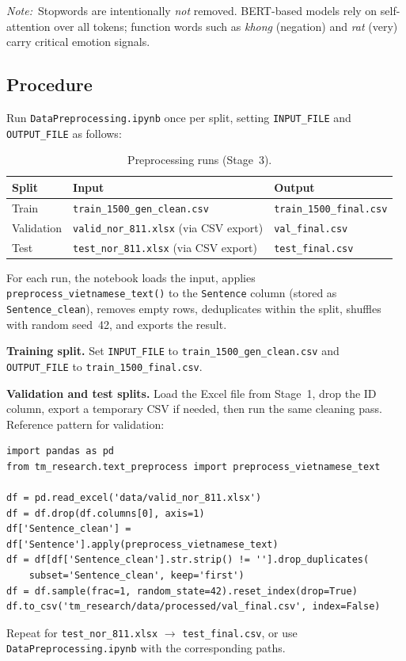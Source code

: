 \documentclass[11pt,a4paper]{article}
\newcommand{\repo}[1]{\texttt{#1}}
\newcommand{\note}[1]{\textit{Note:}~#1}
\begin{document}
\note{Stopwords are intentionally \emph{not} removed. BERT-based models rely on self-attention over all tokens; function words such as \emph{khong} (negation) and \emph{rat} (very) carry critical emotion signals.}

\subsection{Procedure}
Run \repo{DataPreprocessing.ipynb} once per split, setting \texttt{INPUT\_FILE} and \texttt{OUTPUT\_FILE} as follows:

\begin{table}[htbp]
  \centering
  \caption{Preprocessing runs (Stage~3).}
  \label{tab:preprocess-runs}
  \begin{tabular}{@{}lll@{}}
    \toprule
    Split & Input & Output \\
    \midrule
    Train & \repo{train\_1500\_gen\_clean.csv} & \repo{train\_1500\_final.csv} \\
    Validation & \repo{valid\_nor\_811.xlsx} (via CSV export) & \repo{val\_final.csv} \\
    Test & \repo{test\_nor\_811.xlsx} (via CSV export) & \repo{test\_final.csv} \\
    \bottomrule
  \end{tabular}
\end{table}

For each run, the notebook loads the input, applies \texttt{preprocess\_vietnamese\_text()} to the \texttt{Sentence} column (stored as \texttt{Sentence\_clean}), removes empty rows, deduplicates within the split, shuffles with random seed~42, and exports the result.

\textbf{Training split.} Set \texttt{INPUT\_FILE} to \repo{train\_1500\_gen\_clean.csv} and \texttt{OUTPUT\_FILE} to \repo{train\_1500\_final.csv}.

\textbf{Validation and test splits.} Load the Excel file from Stage~1, drop the ID column, export a temporary CSV if needed, then run the same cleaning pass. Reference pattern for validation:
\begin{lstlisting}
import pandas as pd
from tm_research.text_preprocess import preprocess_vietnamese_text

df = pd.read_excel('data/valid_nor_811.xlsx')
df = df.drop(df.columns[0], axis=1)
df['Sentence_clean'] = df['Sentence'].apply(preprocess_vietnamese_text)
df = df[df['Sentence_clean'].str.strip() != ''].drop_duplicates(
    subset='Sentence_clean', keep='first')
df = df.sample(frac=1, random_state=42).reset_index(drop=True)
df.to_csv('tm_research/data/processed/val_final.csv', index=False)
\end{lstlisting}
Repeat for \repo{test\_nor\_811.xlsx} $\rightarrow$ \repo{test\_final.csv}, or use \repo{DataPreprocessing.ipynb} with the corresponding paths.
\end{document}
